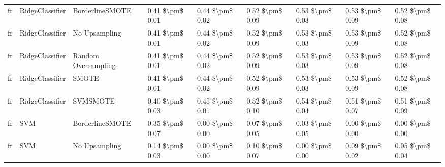 \begin{tabular}{lllllllll}
      fr &                 RidgeClassifier &               BorderlineSMOTE & 0.41 \$\textbackslash pm\$ 0.01 &           0.44 \$\textbackslash pm\$ 0.02 &       0.52 \$\textbackslash pm\$ 0.09 &        0.53 \$\textbackslash pm\$ 0.03 &                         0.53 \$\textbackslash pm\$ 0.09 &     0.52 \$\textbackslash pm\$ 0.08 \\
      fr &                 RidgeClassifier &                 No Upsampling & 0.41 \$\textbackslash pm\$ 0.01 &           0.44 \$\textbackslash pm\$ 0.02 &       0.52 \$\textbackslash pm\$ 0.09 &        0.53 \$\textbackslash pm\$ 0.03 &                         0.53 \$\textbackslash pm\$ 0.09 &     0.52 \$\textbackslash pm\$ 0.08 \\
      fr &                 RidgeClassifier &           Random Oversampling & 0.41 \$\textbackslash pm\$ 0.01 &           0.44 \$\textbackslash pm\$ 0.02 &       0.52 \$\textbackslash pm\$ 0.09 &        0.53 \$\textbackslash pm\$ 0.03 &                         0.53 \$\textbackslash pm\$ 0.09 &     0.52 \$\textbackslash pm\$ 0.08 \\
      fr &                 RidgeClassifier &                         SMOTE & 0.41 \$\textbackslash pm\$ 0.01 &           0.44 \$\textbackslash pm\$ 0.02 &       0.52 \$\textbackslash pm\$ 0.09 &        0.53 \$\textbackslash pm\$ 0.03 &                         0.53 \$\textbackslash pm\$ 0.09 &     0.52 \$\textbackslash pm\$ 0.08 \\
      fr &                 RidgeClassifier &                      SVMSMOTE & 0.40 \$\textbackslash pm\$ 0.03 &           0.45 \$\textbackslash pm\$ 0.01 &       0.52 \$\textbackslash pm\$ 0.10 &        0.54 \$\textbackslash pm\$ 0.04 &                         0.51 \$\textbackslash pm\$ 0.07 &     0.51 \$\textbackslash pm\$ 0.09 \\
      fr &                             SVM &               BorderlineSMOTE & 0.35 \$\textbackslash pm\$ 0.07 &           0.00 \$\textbackslash pm\$ 0.00 &       0.07 \$\textbackslash pm\$ 0.05 &        0.03 \$\textbackslash pm\$ 0.05 &                         0.00 \$\textbackslash pm\$ 0.00 &     0.00 \$\textbackslash pm\$ 0.00 \\
      fr &                             SVM &                 No Upsampling & 0.14 \$\textbackslash pm\$ 0.03 &           0.00 \$\textbackslash pm\$ 0.00 &       0.10 \$\textbackslash pm\$ 0.07 &        0.00 \$\textbackslash pm\$ 0.00 &                         0.09 \$\textbackslash pm\$ 0.02 &     0.05 \$\textbackslash pm\$ 0.04 \\

\end{tabular}
